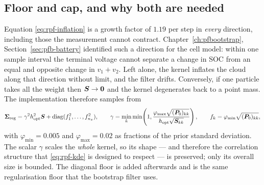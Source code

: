 \subsection{Floor and cap, and why both are needed}
Equation \eqref{eq:rpf-inflation} is a growth factor of $1.19$ per step in \emph{every} direction,
including those the measurement cannot contract.  Chapter~\ref{ch:pfbootstrap},
Section~\ref{sec:pfb-battery} identified such a direction for the cell model: within one sample
interval the terminal voltage cannot separate a change in SOC from an equal and opposite change in
$v_1+v_2$.  Left alone, the kernel inflates the cloud along that direction without limit, and the
filter drifts.  Conversely, if one particle takes all the weight then $\bm{S} \to \bm 0$ and the
kernel degenerates back to a point mass.  The implementation therefore samples from
\begin{equation}
  \bm{\Sigma}_{\mathrm{reg}} = \gamma^2 h_{\mathrm{opt}}^2 \bm{S} + \operatorname{diag}(f_1^2,\dots,f_{n_x}^2),
  \qquad
  \gamma = \min_k \min\!\left(1, \frac{\varphi_{\max}\sqrt{(\bm{P}_0)_{kk}}}{h_{\mathrm{opt}}\sqrt{\bm{S}_{kk}}}\right),
  \qquad f_k = \varphi_{\min}\sqrt{(\bm{P}_0)_{kk}},
  \label{eq:rpf-clip}
\end{equation}
with $\varphi_{\min} = 0.005$ and $\varphi_{\max} = 0.02$ as fractions of the prior standard
deviation.  The scalar $\gamma$ scales the \emph{whole} kernel, so its shape --- and therefore the
correlation structure that \eqref{eq:rpf-kde} is designed to respect --- is preserved; only its
overall size is bounded.  The diagonal floor is added afterwards and is the same regularisation
floor that the bootstrap filter uses.

